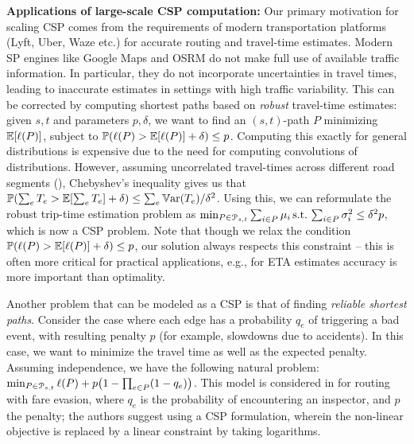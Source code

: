 \smallskip
\noindent\textbf{Applications of large-scale CSP computation:}
Our primary motivation for scaling CSP comes from the requirements of modern transportation platforms (Lyft, Uber, Waze etc.) for accurate routing and travel-time estimates.
Modern SP engines like Google Maps and OSRM do not make full use of available traffic information.
In particular, they do not incorporate uncertainties in travel times, leading to inaccurate estimates in settings with high traffic variability.
This can be corrected by computing shortest paths based on \emph{robust} travel-time estimates:
given $s,t$ and parameters $p,\delta$, we want to find an $(s,t)$-path $P$ minimizing $\mathbb{E}[\ell(P)]$, subject to $\mathbb{P}(\ell(P)>\mathbb{E}[\ell(P)]+\delta)\leq p$.
Computing this exactly for general distributions is expensive due to the need for computing convolutions of distributions. 
However, assuming uncorrelated travel-times across different road segments (), 
Chebyshev's inequality gives us that $\mathbb{P}(\sum_eT_e>\mathbb{E}[\sum_eT_e]+\delta)\leq \sum_e\mathbb{V}\textnormal{ar}(T_e)/\delta^2$. Using this, we can reformulate the robust trip-time estimation problem as 
$\min_{ P\in\mathcal{P}_{s,t}}\sum_{i\in P}\mu_i \, \mbox{s.t.}\, \sum_{i\in P}\sigma^2_i\leq \delta^2p$, which is now a CSP problem. 
Note that though we relax the condition $\mathbb{P}(\ell(P)>\mathbb{E}[\ell(P)]+\delta)\leq p$, our solution always respects this constraint -- this is often more critical for practical applications, e.g., for ETA estimates accuracy is more important than optimality.

Another problem that can be modeled as a CSP is that of finding \emph{reliable shortest paths}.
Consider the case where each edge has a probability $q_e$ of triggering a bad event, with resulting penalty $p$ (for example, slowdowns due to accidents).
In this case, we want to minimize the travel time as well as the expected penalty.
Assuming independence, we have the following natural problem:
$\min_{P\in\Pst} \ell(P)+p\prn*{1-\prod_{e\in P}(1-q_e)}$.
This model is considered in \cite{fareevasion} for routing with fare evasion, where $q_e$ is the probability of encountering an inspector, and $p$ the penalty; the authors suggest using a CSP formulation, wherein the non-linear objective is replaced by a linear constraint by taking logarithms.


